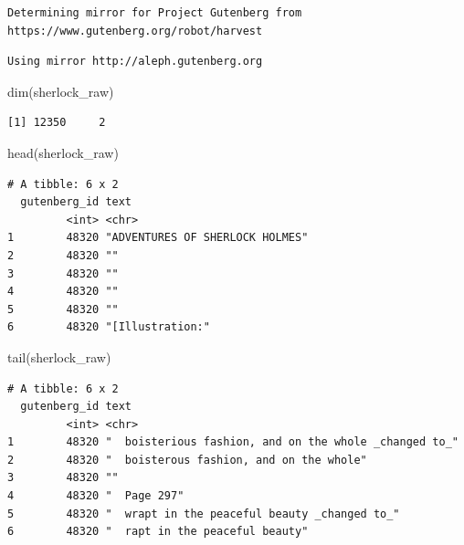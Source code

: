 \documentclass[
  letterpaper,
  DIV=11,
  numbers=noendperiod]{scrreprt}
\newenvironment{Shaded}{\begin{snugshade}}{\end{snugshade}}
\newcommand{\FunctionTok}[1]{\textcolor[rgb]{0.28,0.35,0.67}{#1}}
\newcommand{\NormalTok}[1]{\textcolor[rgb]{0.00,0.23,0.31}{#1}}
\begin{document}
\begin{verbatim}
Determining mirror for Project Gutenberg from https://www.gutenberg.org/robot/harvest
\end{verbatim}

\begin{verbatim}
Using mirror http://aleph.gutenberg.org
\end{verbatim}

\begin{Shaded}
\begin{Highlighting}[]
\FunctionTok{dim}\NormalTok{(sherlock\_raw)}
\end{Highlighting}
\end{Shaded}

\begin{verbatim}
[1] 12350     2
\end{verbatim}

\begin{Shaded}
\begin{Highlighting}[]
\FunctionTok{head}\NormalTok{(sherlock\_raw)}
\end{Highlighting}
\end{Shaded}

\begin{verbatim}
# A tibble: 6 x 2
  gutenberg_id text                           
         <int> <chr>                          
1        48320 "ADVENTURES OF SHERLOCK HOLMES"
2        48320 ""                             
3        48320 ""                             
4        48320 ""                             
5        48320 ""                             
6        48320 "[Illustration:"               
\end{verbatim}

\begin{Shaded}
\begin{Highlighting}[]
\FunctionTok{tail}\NormalTok{(sherlock\_raw)}
\end{Highlighting}
\end{Shaded}

\begin{verbatim}
# A tibble: 6 x 2
  gutenberg_id text                                                  
         <int> <chr>                                                 
1        48320 "  boisterious fashion, and on the whole _changed to_"
2        48320 "  boisterous fashion, and on the whole"              
3        48320 ""                                                    
4        48320 "  Page 297"                                          
5        48320 "  wrapt in the peaceful beauty _changed to_"         
6        48320 "  rapt in the peaceful beauty"                       
\end{verbatim}
\end{document}
